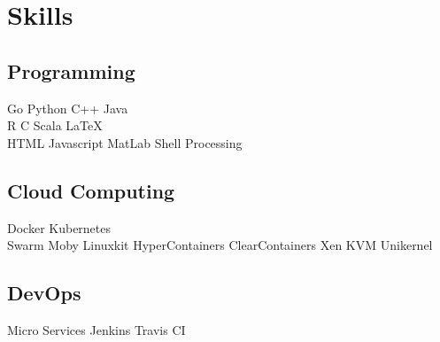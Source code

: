 \documentclass[]{deedy-resume-openfont}
\begin{document}
\begin{minipage}[t]{0.25\textwidth}

\section{Skills}
\sectionsep
\subsection{Programming}
Go \textbullet{} Python \textbullet{} C++ \textbullet{} Java \\
R \textbullet{} C \textbullet{} Scala \textbullet{} \LaTeX\ \\
HTML \textbullet{} Javascript \textbullet{} MatLab \textbullet{} Shell \textbullet{} Processing \\ 
\sectionsep

\subsection{Cloud Computing}
Docker \textbullet{} Kubernetes \\
Swarm \textbullet{} Moby \textbullet{} Linuxkit \textbullet{} HyperContainers \textbullet{} ClearContainers \textbullet{} Xen \textbullet{} KVM \textbullet{} Unikernel \\
\sectionsep

\subsection{DevOps}
Micro Services \textbullet{} Jenkins \textbullet{} Travis CI

%
%

\end{minipage} 
\hfill
\end{document}
